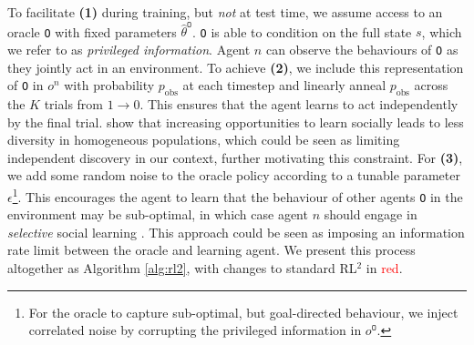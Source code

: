 \documentclass{article}
\begin{document}
To facilitate \textbf{(1)} during training, but \textit{not} at test time, we assume access to an oracle \texttt{O} with fixed parameters $\hat{\theta}^\texttt{O}$. \texttt{O} is able to condition on the full state $s$, which we refer to as \textit{privileged information}. Agent $n$ can observe the behaviours of \texttt{O} as they jointly act in an environment. To achieve \textbf{(2)}, we include this representation of \texttt{O} in $o^n$ with probability $p_\text{obs}$ at each timestep and linearly anneal $p_\text{obs}$ across the $K$ trials from $1 \to 0$. This ensures that the agent learns to act independently by the final trial. \cite{perez23} show that increasing opportunities to learn socially leads to less diversity in homogeneous populations, which could be seen as limiting independent discovery in our context, further motivating this constraint. For \textbf{(3)}, we add some random noise to the oracle policy according to a tunable parameter $\epsilon$\footnote{For the oracle to capture sub-optimal, but goal-directed behaviour, we inject correlated noise by corrupting the privileged information in $o^\texttt{O}$.}. This encourages the agent to learn that the behaviour of other agents \texttt{O} in the environment may be sub-optimal, in which case agent $n$ should engage in \textit{selective} social learning \citep{poulin16}. This approach could be seen as imposing an information rate limit \citep{prystawski23} between the oracle and learning agent. We present this process altogether as Algorithm \ref{alg:rl2}, with changes to standard RL$^2$ in \textcolor{red}{red}.
\end{document}
